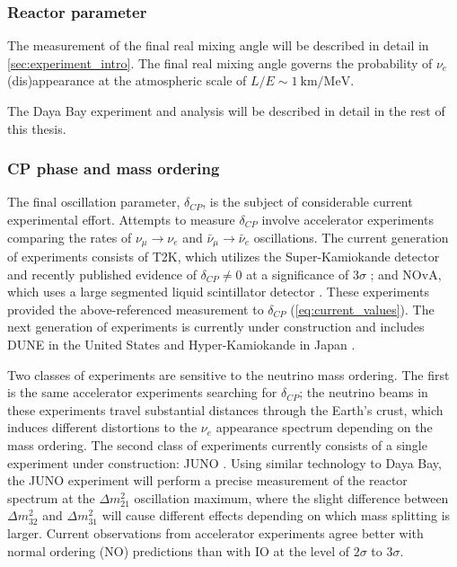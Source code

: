 \subsubsection{Reactor parameter}
The measurement of the final real mixing angle \thetaot{}
will be described in detail in \cref{sec:experiment_intro}.
The final real mixing angle \thetaot{}
governs the probability of $\nu_e$ (dis)appearance
at the atmospheric scale of $L/E \sim \SI{1}{\km\per\MeV}$.

The Daya Bay experiment and \thetaot{} analysis
will be described in detail in the rest of this thesis.

\subsubsection{CP phase and mass ordering}
The final oscillation parameter, $\delta_{CP}$,
is the subject of considerable current experimental effort.
Attempts to measure $\delta_{CP}$ involve
accelerator experiments comparing the rates of
$\nu_\mu\to\nu_e$ and $\bar{\nu}_\mu\to\bar{\nu}_e$ oscillations.
The current generation of experiments consists of
T2K, which utilizes the Super-Kamiokande detector
and recently published evidence of $\delta_{CP}\neq 0$
at a significance of $3\sigma$ \cite{t2k_deltacp};
and NOvA,
which uses a large segmented liquid scintillator detector \cite{nova_deltacp}.
These experiments provided the above-referenced measurement to $\delta_{CP}$
(\cref{eq:current_values}).
The next generation of experiments is currently under construction
and includes DUNE in the United States 
and Hyper-Kamiokande in Japan \cite{hyperk2015}.

Two classes of experiments are sensitive to the neutrino mass ordering.
The first is the same accelerator experiments searching for $\delta_{CP}$;
the neutrino beams in these experiments travel substantial distances
through the Earth's crust,
which induces different distortions to the $\nu_e$ appearance spectrum
depending on the mass ordering.
The second class of experiments currently consists of
a single experiment under construction: JUNO \cite{junoproposal2016}.
Using similar technology to Daya Bay,
the JUNO experiment will perform a precise measurement
of the reactor \nuebar{} spectrum
at the $\Delta m^2_{21}$ oscillation maximum,
where the slight difference between
$\Delta m^2_{32}$ and $\Delta m^2_{31}$
will cause different effects depending
on which mass splitting is larger.
Current observations from accelerator experiments
agree better with normal ordering (NO)
predictions than with IO at the level of $2\sigma$ to $3\sigma$.

